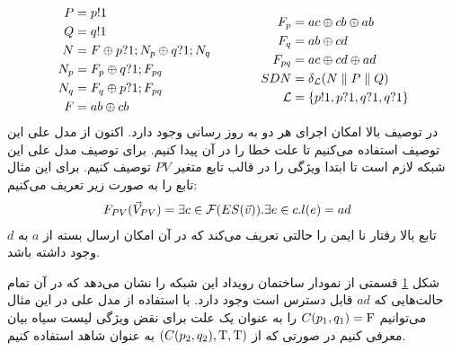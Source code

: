 \begin{equation*}
    \begin{aligned}[c]
        P   & = p!1                             \\
        Q   & = q!1                             \\
        N   & = F \oplus p?1;N_p \oplus q?1;N_q \\
        N_p & = F_p \oplus q?1;F_{pq}           \\
        N_q & = F_q \oplus p?1;F_{pq}           \\
        F   & = ab \oplus cb                    \\
    \end{aligned}
    \qquad\qquad
    \begin{aligned}[c]
        F_p         & = a c \oplus cb \oplus ab \\
        F_q         & = ab \oplus cd            \\
        F_{pq}      & = ac \oplus cd \oplus ad  \\
        SDN         & = \delta_{\mathcal{L}} (N
        \parallel P \parallel Q)                \\
        \mathcal{L} & = \{p!1,p?1,q?1,q?1\}     \\
    \end{aligned}
\end{equation*}
در توصیف بالا امکان اجرای هر دو به روز رسانی وجود دارد.
اکنون از مدل علی این توصیف استفاده می‌کنیم تا علت خطا را در آن پیدا کنیم.
برای توصیف مدل علی این شبکه لازم است تا ابتدا ویژگی را در قالب تابع متغیر
$PV$
توصیف کنیم.
برای این مثال تابع را به صورت زیر تعریف می‌کنیم:
\begin{align*}
    F_{PV}(\vec V_{PV}) & = \exists c \in \mathcal{F}(ES(\vec v)). \exists e \in c. l(e) = ad
\end{align*}
تابع بالا رفتار نا ایمن را حالتی تعریف می‌کند که در آن امکان ارسال بسته از
$a$
به
$d$
وجود داشته باشد.

\begin{figure}
    \caption{}
    \label{fig:blacklist:es}
\end{figure}

شکل
\ref{fig:blacklist:es}
قسمتی از نمودار ساختمان رویداد این شبکه را نشان می‌دهد که در آن تمام حالت‌هایی که
$ad$
قابل دسترس است وجود دارد.
با استفاده از مدل علی در این مثال می‌توانیم
$C(p_1,q_1) = \mathrm{F}$
را به عنوان یک علت برای نقض ویژگی لیست سیاه بیان معرفی کنیم در صورتی که از
$(C(p_2,q_2),\mathrm{T},\mathrm{T})$
به عنوان شاهد استفاده کنیم.
